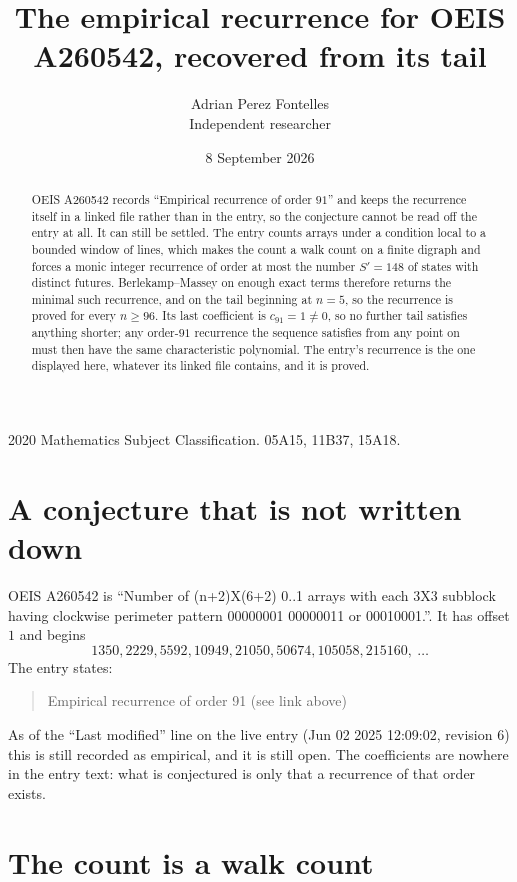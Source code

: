 \documentclass[11pt,a4paper]{article}
\title{The empirical recurrence for OEIS A260542, recovered from its tail}
\author{Adrian Perez Fontelles\\ \small Independent researcher}
\date{8 September 2026}
\theoremstyle{plain}
\theoremstyle{definition}
\begin{document}
\maketitle

\begin{abstract}
OEIS A260542 records ``Empirical recurrence of order $91$'' and keeps the recurrence itself in
a linked file rather than in the entry, so the conjecture cannot be read off the entry at all.
It can still be settled. The entry counts arrays under a condition local to a bounded window of
lines, which makes the count a walk count on a finite digraph and forces a monic integer
recurrence of order at most the number $S'=148$ of states with distinct futures. Berlekamp--Massey on
enough exact terms therefore returns the minimal such recurrence, and on the tail beginning at $n=5$, so the recurrence is proved for every $n\ge96$.
Its last coefficient is $c_{91}=1\neq0$, so no further tail satisfies anything
shorter; any order-$91$ recurrence the sequence satisfies from any point on must then have
the same characteristic polynomial. The entry's recurrence is the one displayed here, whatever
its linked file contains, and it is proved.
\end{abstract}

\noindent\small 2020 Mathematics Subject Classification. 05A15, 11B37, 15A18.\normalsize

\section{A conjecture that is not written down}

OEIS A260542 is ``Number of (n+2)X(6+2) 0..1 arrays with each 3X3 subblock having clockwise perimeter pattern 00000001 00000011 or 00010001.''. It has offset $1$ and begins
\[
1350, 2229, 5592, 10949, 21050, 50674, 105058, 215160,\ \dots
\]
The entry states:
\begin{quote}
Empirical recurrence of order 91 (see link above)
\end{quote}
As of the ``Last modified'' line on the live entry (Jun 02 2025 12:09:02, revision 6)
this is still recorded as empirical, and it is still open. The coefficients are nowhere in the
entry text: what is conjectured is only that a recurrence of that order exists.

\section{The count is a walk count}
\end{document}
